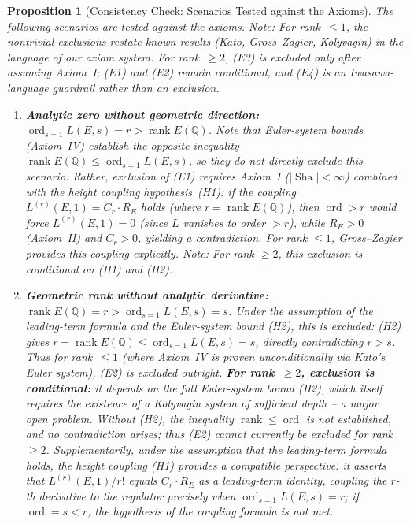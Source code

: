 \documentclass[aps,prd,twocolumn,superscriptaddress,nofootinbib,floatfix]{revtex4-2}
\newtheorem{proposition}[theorem]{Proposition}
\theoremstyle{definition}
\theoremstyle{remark}
\DeclareMathOperator{\ord}{ord}
\DeclareMathOperator{\rank}{rank}
\DeclareMathOperator{\Sha}{Sha}
\begin{document}
\begin{proposition}[Consistency Check: Scenarios Tested against the Axioms]
\label{prop:exclusion}
The following scenarios are tested against the axioms. \textit{Note:} For rank~$\leq 1$, the nontrivial exclusions restate known results (Kato, Gross--Zagier, Kolyvagin) in the language of our axiom system. For rank~$\geq 2$, (E3) is excluded only after assuming Axiom~I; (E1) and (E2) remain conditional, and (E4) is an Iwasawa-language guardrail rather than an exclusion.

\begin{enumerate}
\item[\textbf{(E1)}] \textbf{Analytic zero without geometric direction:} $\ord_{s=1} L(E,s) = r > \rank E(\mathbb{Q})$. Note that Euler-system bounds (Axiom~IV) establish the \textit{opposite} inequality $\rank E(\mathbb{Q}) \leq \ord_{s=1} L(E,s)$, so they do not directly exclude this scenario. Rather, exclusion of (E1) requires Axiom~I ($|\Sha| < \infty$) combined with the height coupling hypothesis~(H1): if the coupling $L^{(r)}(E,1) = C_r \cdot R_E$ holds (where $r = \rank E(\mathbb{Q})$), then $\ord > r$ would force $L^{(r)}(E,1) = 0$ (since $L$ vanishes to order $> r$), while $R_E > 0$ (Axiom~II) and $C_r > 0$, yielding a contradiction. For rank $\leq 1$, Gross--Zagier provides this coupling explicitly. \textit{Note:} For rank $\geq 2$, this exclusion is conditional on (H1) and (H2).

\item[\textbf{(E2)}] \textbf{Geometric rank without analytic derivative:} $\rank E(\mathbb{Q}) = r > \ord_{s=1} L(E,s) = s$. \textit{Under the assumption of the leading-term formula} and the Euler-system bound (H2), this is excluded: (H2) gives $r = \rank E(\mathbb{Q}) \leq \ord_{s=1} L(E,s) = s$, directly contradicting $r > s$. Thus for rank~$\leq 1$ (where Axiom~IV is proven unconditionally via Kato's Euler system), (E2) is excluded outright. \textbf{For rank~$\geq 2$, exclusion is conditional:} it depends on the full Euler-system bound (H2), which itself requires the existence of a Kolyvagin system of sufficient depth -- a major open problem. Without (H2), the inequality $\rank \leq \ord$ is not established, and no contradiction arises; thus (E2) \textit{cannot currently be excluded} for rank~$\geq 2$. Supplementarily, under the assumption that the leading-term formula holds, the height coupling (H1) provides a compatible perspective: it asserts that $L^{(r)}(E,1)/r!$ equals $C_r \cdot R_E$ as a \textit{leading-term identity}, coupling the $r$-th derivative to the regulator precisely when $\ord_{s=1} L(E,s) = r$; if $\ord = s < r$, the hypothesis of the coupling formula is not met.


\end{enumerate}
\end{proposition}
\end{document}
